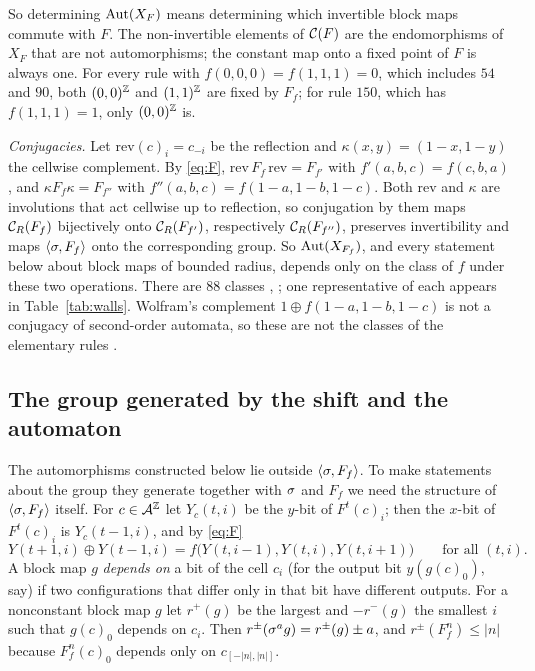 So determining $\operatorname{Aut}(X_F)$ means determining which invertible block maps commute with $F$. The non-invertible elements of $\mathcal{C}(F)$ are the endomorphisms of $X_F$ that are not automorphisms; the constant map onto a fixed point of $F$ is always one. For every rule with $f(0,0,0)=f(1,1,1)=0$, which includes $54$ and $90$, both $(0,0)^{\mathbb{Z}}$ and $(1,1)^{\mathbb{Z}}$ are fixed by $F_f$; for rule $150$, which has $f(1,1,1)=1$, only $(0,0)^{\mathbb{Z}}$ is.

\begin{sloppypar}
\emph{Conjugacies.} Let $\mathrm{rev}(c)_i=c_{-i}$ be the reflection and $\kappa(x,y)=(1-x,1-y)$ the cellwise complement. By \eqref{eq:F}, $\mathrm{rev}\,F_f\,\mathrm{rev}=F_{f'}$ with $f'(a,b,c)=f(c,b,a)$, and $\kappa F_f\kappa=F_{f''}$ with $f''(a,b,c)=f(1-a,1-b,1-c)$. Both $\mathrm{rev}$ and $\kappa$ are involutions that act cellwise up to reflection, so conjugation by them maps $\mathcal{C}_R(F_f)$ bijectively onto $\mathcal{C}_R(F_{f'})$, respectively $\mathcal{C}_R(F_{f''})$, preserves invertibility and maps $\langle\sigma,F_f\rangle$ onto the corresponding group. So $\operatorname{Aut}(X_{F_f})$, and every statement below about block maps of bounded radius, depends only on the class of $f$ under these two operations. There are $88$ classes \cite{Takesue1987}, \cite[Table~I]{Takesue1989}; one representative of each appears in Table~\ref{tab:walls}. Wolfram's complement $1\oplus f(1-a,1-b,1-c)$ is not a conjugacy of second-order automata, so these are not the classes of the elementary rules \cite[p.~377 and footnote~3]{Takesue1989}.
\end{sloppypar}

\subsection{The group generated by the shift and the automaton}

The automorphisms constructed below lie outside $\langle\sigma,F_f\rangle$. To make statements about the group they generate together with $\sigma$ and $F_f$ we need the structure of $\langle\sigma,F_f\rangle$ itself. For $c\in\mathcal{A}^{\mathbb{Z}}$ let $Y_c(t,i)$ be the $y$-bit of $F^t(c)_i$; then the $x$-bit of $F^t(c)_i$ is $Y_c(t-1,i)$, and by \eqref{eq:F}
\[
Y(t+1,i)\oplus Y(t-1,i)=f\bigl(Y(t,i-1),Y(t,i),Y(t,i+1)\bigr)\qquad\text{for all }(t,i).
\]
A block map $g$ \emph{depends on} a bit of the cell $c_i$ (for the output bit $y(g(c)_0)$, say) if two configurations that differ only in that bit have different outputs. For a nonconstant block map $g$ let $r^+(g)$ be the largest and $-r^-(g)$ the smallest $i$ such that $g(c)_0$ depends on $c_i$. Then $r^\pm(\sigma^ag)=r^\pm(g)\pm a$, and $r^\pm(F_f^n)\le|n|$ because $F_f^n(c)_0$ depends only on $c_{[-|n|,|n|]}$.

